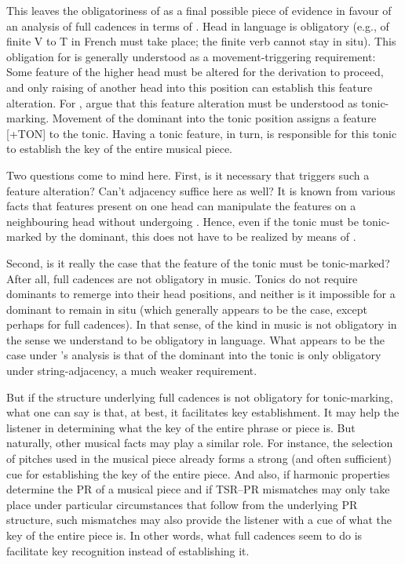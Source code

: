 \documentclass[output=paper]{langsci/langscibook}
\begin{document}
This leaves the obligatoriness of  as a final possible piece of
evidence in favour of an analysis of full cadences in terms of .
Head  in language is obligatory (e.g.,  of finite V to T in
French must take place; the finite verb cannot stay in situ). This obligation
for  is generally understood as a movement-triggering requirement:
Some feature of the higher head must be altered for the derivation to proceed,
and only raising of another head into this position can establish this feature
alteration. For , \citeauthor{KatzPes2011} argue that this feature
alteration must be understood as tonic-marking. Movement of the dominant into
the tonic position assigns a feature [+TON] to the tonic. Having a tonic
feature, in turn, is responsible for this tonic to establish the key of the
entire musical piece.

Two questions come to mind here. First, is it necessary that  triggers
such a feature alteration? Can’t adjacency suffice here as well? It is known
from various  facts that features present on one head can
manipulate the features on a neighbouring head without undergoing .
Hence, even if the tonic must be tonic-marked by the dominant, this does not
have to be realized by means of .

Second, is it really the case that the feature of the tonic must be
tonic-marked? After all, full cadences are not obligatory in music. Tonics do
not require dominants to remerge into their head positions, and neither is it
impossible for a dominant to remain in situ (which generally appears to be the
case, except perhaps for full cadences). In that sense,  of the
kind in music is not obligatory in the sense we understand  to be
obligatory in language. What appears to be the case under
\citeauthor{KatzPes2011}’s analysis is that  of the dominant into the
tonic is only obligatory under string-adjacency, a much weaker requirement.

But if the structure underlying full cadences is not obligatory for
tonic-marking, what one can say is that, at best, it facilitates key
establishment. It may help the listener in determining what the key of the
entire phrase or piece is. But naturally, other musical facts may play a
similar role. For instance, the selection of pitches used in the musical piece
already forms a strong (and often sufficient) cue for establishing the key of
the entire piece. And also, if harmonic properties determine the \gls{PR} of a
musical piece and if \gls{TSR}--\gls{PR} mismatches may only take place under
particular circumstances that follow from the underlying \gls{PR} structure,
such mismatches may also provide the listener with a cue of what the key of the
entire piece is. In other words, what full cadences seem to do is facilitate
key recognition instead of establishing it.
\end{document}
